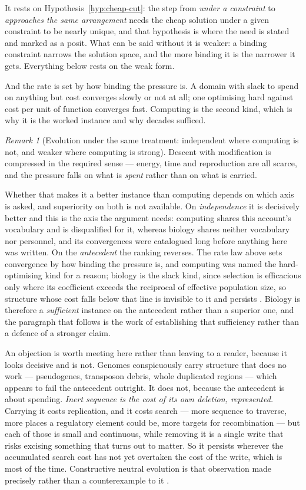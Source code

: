 \documentclass[11pt,a4paper]{article}
\theoremstyle{remark}\newtheorem{remark}[definition]{Remark}
\begin{document}
It rests on Hypothesis~\ref{hyp:cheap-cut}: the step from \emph{under a constraint} to
\emph{approaches the same arrangement} needs the cheap solution under a given constraint to be nearly
unique, and that hypothesis is where the need is stated and marked as a posit. What can be said
without it is weaker: a binding constraint narrows the solution space, and the more binding it is the
narrower it gets. Everything below rests on the weak form.

And the rate is set by how binding the pressure is. A domain with slack to spend on anything but cost
converges slowly or not at all; one optimising hard against cost per unit of function converges fast.
Computing is the second kind, which is why it is the worked instance and why decades sufficed.

\begin{remark}[Evolution under the same treatment: independent where computing is not, and weaker where computing is strong]\label{rem:evolution-compression}
Descent with modification is compressed in the required sense --- energy, time and reproduction are
all scarce, and the pressure falls on what is \emph{spent} rather than on what is carried.

Whether that makes it a better instance than computing depends on which axis is asked, and superiority on both is not
available. On \emph{independence} it
is decisively better and this is the axis the argument needs: computing shares this account's
vocabulary and is disqualified for it, whereas biology shares neither vocabulary nor personnel, and
its convergences were catalogued long before anything here was written. On the \emph{antecedent} the
ranking reverses. The rate law above sets convergence by how binding the pressure is, and computing
was named the hard-optimising kind for a reason; biology is the slack kind, since selection is
efficacious only where its coefficient exceeds the reciprocal of effective population size, so
structure whose cost falls below that line is invisible to it and persists \citep{ohta1973}. Biology
is therefore a \emph{sufficient} instance on the antecedent rather than a superior one, and the
paragraph that follows is the work of establishing that sufficiency rather than a defence of a
stronger claim.

An objection is worth meeting here rather than leaving to a reader, because it looks decisive and is
not. Genomes conspicuously carry structure that does no work --- pseudogenes, transposon debris,
whole duplicated regions --- which appears to fail the antecedent outright. It does not, because the
antecedent is about spending. \emph{Inert sequence is the cost of its own deletion, represented.}
Carrying it costs replication, and it costs search --- more sequence to
traverse, more places a regulatory element could be, more targets for recombination --- but each of
those is small and continuous, while removing it is a single write that risks excising something that
turns out to matter. So it persists wherever the accumulated search cost has not yet overtaken the
cost of the write, which is most of the time. Constructive neutral evolution is that observation made precisely rather than a
counterexample to it \citep{stoltzfus1999,lukes2011}.


\end{remark}
\end{document}
